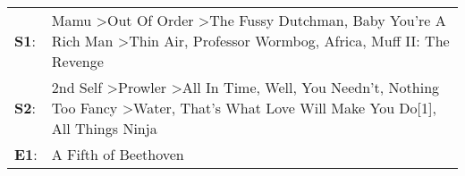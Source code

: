 \begin{supertabular}{p{0.03\textwidth}p{0.92\textwidth}}
 \textbf{S1}:  &            Mamu\textsuperscript{} \textgreater \enspace Out Of Order\textsuperscript{} \textgreater \enspace The Fussy Dutchman\textsuperscript{}, \enspace Baby You're A Rich Man\textsuperscript{} \textgreater \enspace Thin Air\textsuperscript{}, \enspace Professor Wormbog\textsuperscript{}, \enspace Africa\textsuperscript{}, \enspace Muff II: The Revenge\textsuperscript{}  \enspace  \\
 \textbf{S2}:  &  2nd Self\textsuperscript{} \textgreater \enspace Prowler\textsuperscript{} \textgreater \enspace All In Time\textsuperscript{}, \enspace Well, You Needn't\textsuperscript{}, \enspace Nothing Too Fancy\textsuperscript{} \textgreater \enspace Water\textsuperscript{}, \enspace That's What Love Will Make You Do[1]\textsuperscript{}, \enspace All Things Ninja\textsuperscript{}  \enspace  \\
 \textbf{E1}:  &                                                                                                                                                                                                                                                                                                                                                  A Fifth of Beethoven\textsuperscript{}  \enspace  \\
\end{supertabular}
